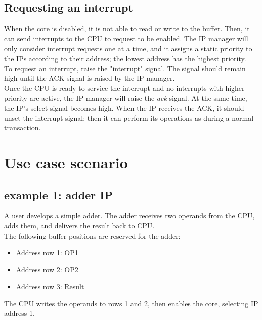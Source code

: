 \subsection{Requesting an interrupt} \label{4.3}
When the core is disabled, it is not able to read or write to the buffer. Then, it can send interrupts to the CPU to request to be enabled. The IP manager will only consider interrupt requests one at a time, and it assigns a static priority to the IPs according to their address; the lowest address has the highest priority. \\
\bigskip
To request an interrupt, raise the "interrupt" signal. The signal should remain high until the ACK signal is raised by the IP manager.\\ 
\bigskip
Once the CPU is ready to service the interrupt and no interrupts with higher priority are active, the IP manager will raise the \textit{ack} signal. At the same time, the IP's select signal becomes high. When the IP receives the ACK, it should unset the interrupt signal; then it can perform its operations as during a normal transaction.




\section{Use case scenario}


\subsection{example 1: adder IP}

A user develops a simple adder. The adder receives two operands from the CPU, adds them, and delivers the result back to CPU. \\

The following buffer positions are reserved for the adder:
\begin{itemize}
\item Address row 1: OP1 
\item Address row 2: OP2
\item Address row 3: Result
\end{itemize}

The CPU writes the operands to rows 1 and 2, then enables the core, selecting IP address 1.\\

